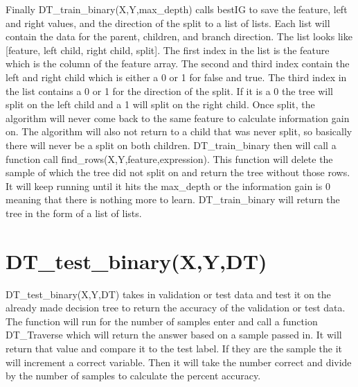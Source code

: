 \documentclass{article}
\begin{document}
Finally DT\_train\_binary(X,Y,max\_depth) calls bestIG to save the feature, left and right values, and the direction of the split to a list of lists. Each list will contain the data for the parent, children, and branch direction. The list looks like [feature, left child, right child, split]. The first index in the list is the feature which is the column of the feature array. The second and third index contain the left and right child which is either a 0 or 1 for false and true. The third index in the list contains a 0 or 1 for the direction of the split. If it is a 0 the tree will split on the left child and a 1 will split on the right child. Once split, the algorithm will never come back to the same feature to calculate information gain on. The algorithm will also not return to a child that was never split, so basically there will never be a split on both children. DT\_train\_binary then will call a function call find\_rows(X,Y,feature,expression). This function will delete the sample of which the tree did not split on and return the tree without those rows. It will keep running until it hits the max\_depth or the information gain is 0 meaning that there is nothing more to learn. DT\_train\_binary will return the tree in the form of a list of lists. 

\section{DT\_test\_binary(X,Y,DT)}
DT\_test\_binary(X,Y,DT) takes in validation or test data and test it on the already made decision tree to return the accuracy of the validation or test data. The function will run for the number of samples enter and call a function DT\_Traverse which will return the answer based on a sample passed in. It will return that value and compare it to the test label. If they are the sample the it will increment a correct variable. Then it will take the number correct and divide by the number of samples to calculate the percent accuracy. 
\end{document}
